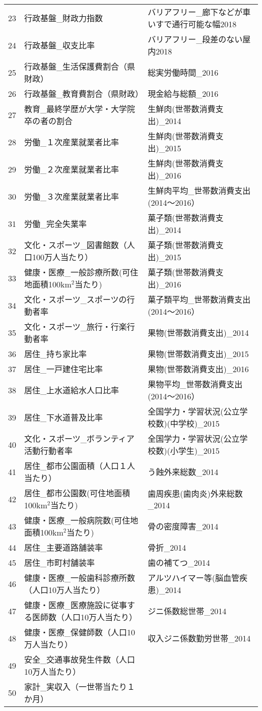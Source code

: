 \begin{table}[ht]
\begin{tabular}{rll}
  23 & 行政基盤\_財政力指数 & バリアフリー\_廊下などが車いすで通行可能な幅2018 \\ 
  24 & 行政基盤\_収支比率 & バリアフリー\_段差のない屋内2018 \\ 
  25 & 行政基盤\_生活保護費割合（県財政） & 総実労働時間\_2016 \\ 
  26 & 行政基盤\_教育費割合（県財政） & 現金給与総額\_2016 \\ 
  27 & 教育\_最終学歴が大学・大学院卒の者の割合 & 生鮮肉(世帯数消費支出)\_2014 \\ 
  28 & 労働\_１次産業就業者比率 & 生鮮肉(世帯数消費支出)\_2015 \\ 
  29 & 労働\_２次産業就業者比率 & 生鮮肉(世帯数消費支出)\_2016 \\ 
  30 & 労働\_３次産業就業者比率 & 生鮮肉平均\_世帯数消費支出(2014〜2016） \\ 
  31 & 労働\_完全失業率 & 菓子類(世帯数消費支出)\_2014 \\ 
  32 & 文化・スポーツ\_図書館数（人口100万人当たり） & 菓子類(世帯数消費支出)\_2015 \\ 
  33 & 健康・医療\_一般診療所数(可住地面積100km$^2$当たり) & 菓子類(世帯数消費支出)\_2016 \\ 
  34 & 文化・スポーツ\_スポーツの行動者率 & 菓子類平均\_世帯数消費支出(2014〜2016） \\ 
  35 & 文化・スポーツ\_旅行・行楽行動者率 & 果物(世帯数消費支出)\_2014 \\ 
  36 & 居住\_持ち家比率 & 果物(世帯数消費支出)\_2015 \\ 
  37 & 居住\_一戸建住宅比率 & 果物(世帯数消費支出)\_2016 \\ 
  38 & 居住\_上水道給水人口比率 & 果物平均\_世帯数消費支出(2014〜2016） \\ 
  39 & 居住\_下水道普及比率 & 全国学力・学習状況(公立学校数)(中学校)\_2015 \\ 
  40 & 文化・スポーツ\_ボランティア活動行動者率 & 全国学力・学習状況(公立学校数)(小学生)\_2015 \\ 
  41 & 居住\_都市公園面積（人口１人当たり） & う蝕外来総数\_2014 \\ 
  42 & 居住\_都市公園数(可住地面積100km$^2$当たり) & 歯周疾患(歯肉炎)外来総数\_2014 \\ 
  43 & 健康・医療\_一般病院数(可住地面積100km$^2$当たり) & 骨の密度障害\_2014 \\ 
  44 & 居住\_主要道路舗装率 & 骨折\_2014 \\ 
  45 & 居住\_市町村舗装率 & 歯の補てつ\_2014 \\ 
  46 & 健康・医療\_一般歯科診療所数（人口10万人当たり） & アルツハイマー等(脳血管疾患)\_2014 \\ 
  47 & 健康・医療\_医療施設に従事する医師数（人口10万人当たり） & ジニ係数総世帯\_2014 \\ 
  48 & 健康・医療\_保健師数（人口10万人当たり） & 収入ジニ係数勤労世帯\_2014 \\ 
  49 & 安全\_交通事故発生件数（人口10万人当たり） &  \\ 
  50 & 家計\_実収入（一世帯当たり１か月） &  \\ 
   \hline
\end{tabular}
\endgroup
\end{table}
